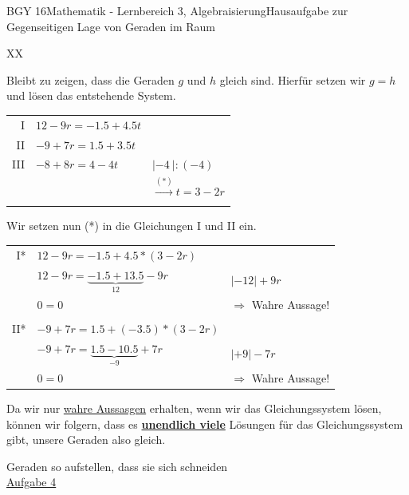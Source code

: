 \documentclass[oneside,openany,headings=optiontotoc,11pt,numbers=noenddot]{scrreprt}
\begin{document}
\begin{worksheet}{BGY 16}{Mathematik - Lernbereich 3, Algebraisierung}{Hausaufgabe zur Gegenseitigen Lage von Geraden im Raum}
\begin{framed}
\begin{tabularx}{\textwidth}{XX}
			\end{tabularx}
			Bleibt zu zeigen, dass die Geraden \(g\) und \(h\) gleich sind. Hierfür setzen wir \(g=h\) und lösen das entstehende System.\\
			\begin{tabularx}{\textwidth}{rXl}
				I & \(12 -9r = -1.5 + 4.5t\) & \(\)\\
				II & \(-9+7r = 1.5 + 3.5t\) & \\
				III & \(-8+8r = 4 -4t\) & \(|-4\ | :(-4)\)\\
				& & \(\xrightarrow{(*)} t = 3-2r\)\\
				\hline\\
			\end{tabularx}
			Wir setzen nun (*) in die Gleichungen I und II ein.\\
			\begin{tabularx}{\textwidth}{rXl}
				I* & \(12 -9r = -1.5 + 4.5*(3-2r)\)\\
				& \(12 -9r = \underbrace{-1.5 + 13.5}_{12} -9r\) & \(|-12 |+9r\)\\
				& \(0 = 0\) & \(\Rightarrow\) Wahre Aussage!\\
				\hline\\
				II* & \(-9+7r = 1.5 + (-3.5)*(3-2r)\) & \\
				& \(-9+7r = \underbrace{1.5 - 10.5}_{-9} +7r\) & \(| +9 | -7r\)\\
				& \(0 = 0\) & \(\Rightarrow\) Wahre Aussage!
			\end{tabularx}
			Da wir nur \underline{wahre Aussasgen} erhalten, wenn wir das Gleichungssystem lösen, können wir folgern, dass es \underline{\textbf{unendlich viele}} Lösungen für das Gleichungssystem gibt, unsere Geraden also \color{codegreen}gleich\normalcolor.
		\end{framed}
		\begin{framed}
			\noindent
			\tiny{\color{codegray}Geraden so aufstellen, dass sie sich schneiden}\\
			\normalsize\normalcolor
			\noindent
			\underline{Aufgabe 4}\\

\end{framed}
\end{worksheet}
\end{document}
